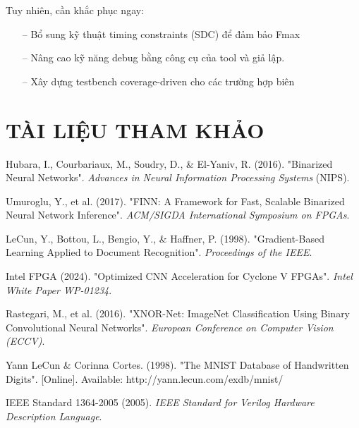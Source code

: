 \documentclass[a4paper]{article}
\numberwithin{figure}{section}
\begin{document}
Tuy nhiên, cần khắc phục ngay:
\begin{itemize}
    \item[--] Bổ sung kỹ thuật timing constraints (SDC) để đảm bảo Fmax
    \item[--] Nâng cao kỹ năng debug bằng công cụ của tool và giả lập.
    \item[--] Xây dựng testbench coverage-driven cho các trường hợp biên
\end{itemize}

\newpage
\section{TÀI LIỆU THAM KHẢO}

\begin{thebibliography}{9999}
Hubara, I., Courbariaux, M., Soudry, D., \& El-Yaniv, R. (2016). "Binarized Neural Networks". \textit{Advances in Neural Information Processing Systems} (NIPS).

Umuroglu, Y., et al. (2017). "FINN: A Framework for Fast, Scalable Binarized Neural Network Inference". \textit{ACM/SIGDA International Symposium on FPGAs}.

LeCun, Y., Bottou, L., Bengio, Y., \& Haffner, P. (1998). "Gradient-Based Learning Applied to Document Recognition". \textit{Proceedings of the IEEE}.


Intel FPGA (2024). "Optimized CNN Acceleration for Cyclone V FPGAs". \textit{Intel White Paper WP-01234}.

Rastegari, M., et al. (2016). "XNOR-Net: ImageNet Classification Using Binary Convolutional Neural Networks". \textit{European Conference on Computer Vision (ECCV)}.

Yann LeCun \& Corinna Cortes. (1998). "The MNIST Database of Handwritten Digits". [Online]. Available: http://yann.lecun.com/exdb/mnist/

IEEE Standard 1364-2005 (2005). \textit{IEEE Standard for Verilog Hardware Description Language}.
\end{thebibliography}
\end{document}
